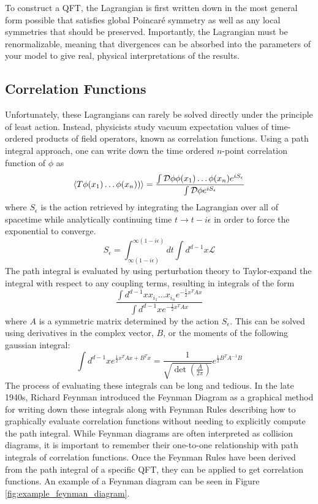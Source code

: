 To construct a QFT, the Lagrangian is first written down in the most general form possible that satisfies global Poincaré symmetry as well as any local symmetries that should be preserved. Importantly, the Lagrangian must be renormalizable, meaning that divergences can be absorbed into the parameters of your model to give real, physical interpretations of the results.

\subsection{Correlation Functions}

Unfortunately, these Lagrangians can rarely be solved directly under the principle of least action. Instead, physicists study vacuum expectation values of time-ordered products of field operators, known as correlation functions. Using a path integral approach, one can write down the time ordered $n$-point correlation function of $\phi$ as
\begin{equation}
\braket{T \phi(x_{1}) \dots  \phi({x_{n}}))} = \frac{\int \mathcal{D}\phi \phi(x_{1}) \dots  \phi({x_{n}}) e^{iS_{\epsilon}}}{\int \mathcal{D}\phi e^{iS_{\epsilon}}}
\end{equation}
where $S_\epsilon$ is the action retrieved by integrating the Lagrangian over all of spacetime while analytically continuing time $t \to t - i\epsilon$ in order to force the exponential to converge. 
\begin{equation}
S_{\epsilon} = \int^{\infty(1-i\epsilon)}_{\infty(1-i\epsilon)} dt \int d^{d-1} x \mathcal{L}
\end{equation}
The path integral is evaluated by using perturbation theory to Taylor-expand the integral with respect to any coupling terms, resulting in integrals of the form 
\begin{equation}
\frac{\int d^{d-1}x x_{i_{1}}\dots x_{i_{n}} e^{-\frac{1}{2}x^TAx}}{\int d^{d-1}x  e^{-\frac{1}{2}x^TAx}}
\end{equation}
where $A$ is a symmetric matrix determined by the action $S_\epsilon$. This can be solved using derivatives in the complex vector, $B$, or the moments of the following gaussian integral:
\begin{equation}
\int d^{d-1} x e^{\frac{1}{2}x^TAx + B^Tx} = \frac{1}{\sqrt{ \det\left( \frac{A}{2\pi}\right) } } e^{\frac{1}{2}B^T A^{-1} B}
\end{equation}
The process of evaluating these integrals can be long and tedious. In the late 1940s, Richard Feynman introduced the Feynman Diagram as a graphical method for writing down these integrals along with Feynman Rules describing how to graphically evaluate correlation functions without needing to explicitly compute the path integral. While Feynman diagrams are often interpreted as collision diagrams, it is important to remember their one-to-one relationship with path integrals of correlation functions. Once the Feynman Rules have been derived from the path integral of a specific QFT, they can be applied to get correlation functions. An example of a Feynman diagram can be seen in Figure \ref{fig:example_feynman_diagram}.

